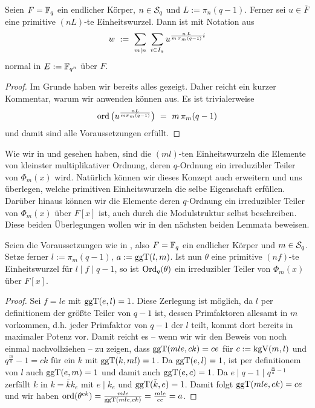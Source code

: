 \begin{satz}
  Seien $F = \F_q$ ein endlicher Körper, $n\in \S_q$ und $L:=\pi_n(q-1)$.
  Ferner sei $u \in \bar F$ eine primitive $(nL)$-te Einheitswurzel. Dann ist
  mit Notation aus 
  \[ w \speq{:=} \sum_{m\mid n} \ \sum_{i\in I_a}
    u^{\frac{n\, L}{m\, \pi_m(q-1)}i}\]
  normal in $E := \F_{q^n}$ über $F$.
\end{satz}
\begin{proof}
  Im Grunde haben wir bereits alles gezeigt. Daher reicht ein kurzer Kommentar,
  warum wir  anwenden können aus. Es ist
  trivialerweise 
  \[ \ord\big( u^{\frac{nL}{m\pi_m(q-1)}} \big) \speq=
    m\, \pi_m(q-1)\]
  und damit sind alle Voraussetzungen erfüllt.
\end{proof}

\begin{bemerkung}
  Wie wir in  und 
  gesehen haben, sind die $(ml)$-ten Einheitswurzeln die Elemente von kleinster
  multiplikativer Ordnung, deren $q$-Ordnung ein irreduzibler Teiler von
  $\Phi_m(x)$ wird. Natürlich können wir dieses Konzept auch erweitern und uns
  überlegen, welche primitiven Einheitswurzeln die selbe Eigenschaft erfüllen.
  Darüber hinaus können wir die Elemente deren $q$-Ordnung ein irreduzibler
  Teiler von $\Phi_m(x)$ über $F[x]$ ist, auch durch die Modulstruktur selbst
  beschreiben.
  Diese beiden Überlegungen wollen wir in den nächsten beiden Lemmata beweisen.
\end{bemerkung}

\begin{lemma}
  \label{lemma:hoehere_wurzeln_auch_erzeuger}
  Seien die Voraussetzungen wie in , also
  $F = \F_q$ ein endlicher Körper und $m\in \S_q$. Setze ferner 
  $l := \pi_m(q-1)$, $a := \ggT(l,m)$. 
  Ist nun $\theta$ eine primitive $(nf)$-te Einheitswurzel für 
  $l \mid f \mid q-1$, so ist $\Ord_q(\theta)$ ein irreduzibler Teiler
  von $\Phi_m(x)$ über $F[x]$.
\end{lemma}
\begin{proof}
  Sei $f = le$ mit $\ggT(e,l) = 1$. Diese Zerlegung ist möglich, da
  $l$ per definitionem der größte Teiler von $q-1$ ist, dessen Primfaktoren
  allesamt in $m$ vorkommen, d.h. jeder Primfaktor von $q-1$ der $l$ teilt,
  kommt dort bereits in maximaler Potenz vor.
  Damit reicht es -- wenn wir wir den Beweis von
   noch einmal nachvollziehen -- zu zeigen,
  dass $\ggT(mle, ck) = ce$ für $c := \kgV(m,l)$ und 
  $q^{\frac m a} -1 = ck$ für ein $k$ mit $\ggT(k,ml) = 1$. Da $\ggT(e,l) = 1$,
  ist per definitionem von $l$ auch $\ggT(e,m) = 1$ und damit auch
  $\ggT(e,c) = 1$. Da $e \mid q-1\mid q^{\frac m a -1}$ zerfällt $k$ 
  in $k = \bar k k_e$ mit $e \mid k_e$ und $\ggT(\bar k,e) = 1$. Damit
  folgt $\ggT(mle, ck) = ce$ und wir haben
  $\ord(\theta^{ck}) = \frac{mle}{\ggT(mle,ck)} = \frac{mle}{ce} = a$.
\end{proof}

